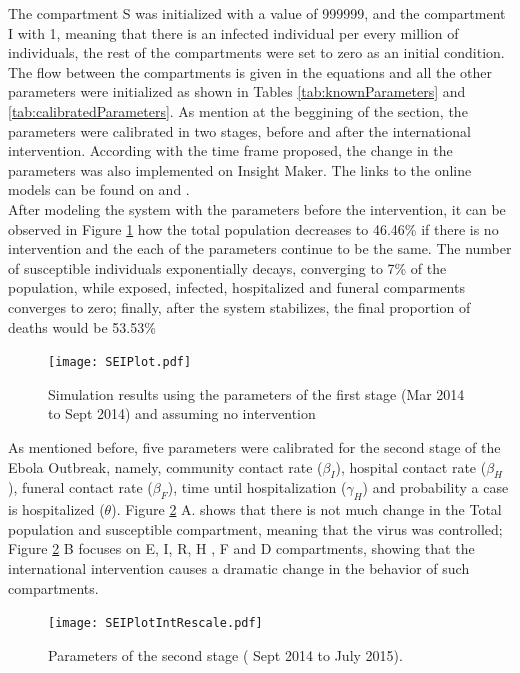 \noindent The compartment S was initialized with a value of 999999, and the compartment I with 1, meaning that there is an infected individual per every million of individuals, the rest of the compartments were set to zero as an initial condition. The flow between the compartments is given in the equations and all the other parameters were initialized as shown in Tables   \ref{tab:knownParameters} and \ref{tab:calibratedParameters}.  As mention at the beggining of the section, the parameters were calibrated in two stages, before and after the international intervention. According with the time frame proposed, the change in the parameters was also implemented on Insight Maker. The links to the online models can be found on \cite{IM_AI} and  \cite{IM_BI}.\\ 


%
\noindent After modeling the system with the parameters before the intervention, it can be observed in Figure \ref{fig:LB_IM_NoIn} how the total population decreases to 46.46\%  if there is no intervention and the each of the parameters continue to be the same. The number of susceptible individuals exponentially decays, converging to 7\% of the population, while exposed, infected, hospitalized and funeral comparments converges to zero; finally, after the system stabilizes, the final proportion of deaths would be 53.53\% \\

\begin{figure}[!h]
  \centering
  \texttt{[image: SEIPlot.pdf]}
  \caption{Simulation results using the parameters of the first stage (Mar 2014  to Sept 2014) and assuming no intervention}
\label{fig:LB_IM_NoIn} 
\end{figure}

\noindent As mentioned before, five parameters were calibrated for the second stage of the Ebola Outbreak, namely, community contact rate ($\beta_I$), hospital contact rate ($\beta_H$), funeral contact rate ($\beta_F$), time until hospitalization ($\gamma_H$) and probability a case is hospitalized ($\theta$). Figure \ref{fig:LB_IM_In} A. shows that there is not much change in the Total population and susceptible compartment, meaning that the virus was controlled;  Figure \ref{fig:LB_IM_In} B focuses on E, I, R, H , F and D compartments, showing that the international intervention causes a dramatic change in the behavior of such compartments.


\begin{figure}[h!]
  \centering
  \texttt{[image: SEIPlotIntRescale.pdf]} 
\caption{ Parameters of the second stage ( Sept 2014 to July 2015).} 
\label{fig:LB_IM_In} 
\end{figure}






